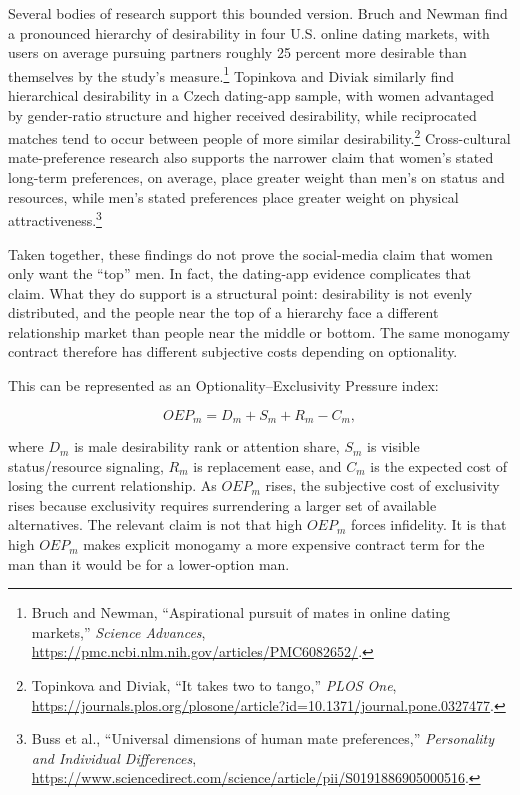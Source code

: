 \documentclass[12pt]{article}
\newcommand{\SourceNote}[1]{\footnote{#1}}
\begin{document}
Several bodies of research support this bounded version. Bruch and Newman find a pronounced hierarchy of desirability in four U.S. online dating markets, with users on average pursuing partners roughly 25 percent more desirable than themselves by the study's measure.\SourceNote{Bruch and Newman, ``Aspirational pursuit of mates in online dating markets,'' \textit{Science Advances}, \url{https://pmc.ncbi.nlm.nih.gov/articles/PMC6082652/}.} Topinkova and Diviak similarly find hierarchical desirability in a Czech dating-app sample, with women advantaged by gender-ratio structure and higher received desirability, while reciprocated matches tend to occur between people of more similar desirability.\SourceNote{Topinkova and Diviak, ``It takes two to tango,'' \textit{PLOS One}, \url{https://journals.plos.org/plosone/article?id=10.1371/journal.pone.0327477}.} Cross-cultural mate-preference research also supports the narrower claim that women's stated long-term preferences, on average, place greater weight than men's on status and resources, while men's stated preferences place greater weight on physical attractiveness.\SourceNote{Buss et al., ``Universal dimensions of human mate preferences,'' \textit{Personality and Individual Differences}, \url{https://www.sciencedirect.com/science/article/pii/S0191886905000516}.}

Taken together, these findings do not prove the social-media claim that women only want the ``top'' men. In fact, the dating-app evidence complicates that claim. What they do support is a structural point: desirability is not evenly distributed, and the people near the top of a hierarchy face a different relationship market than people near the middle or bottom. The same monogamy contract therefore has different subjective costs depending on optionality.

This can be represented as an Optionality--Exclusivity Pressure index:

\begin{equation}
  OEP_m = D_m + S_m + R_m - C_m,
\end{equation}

where $D_m$ is male desirability rank or attention share, $S_m$ is visible status/resource signaling, $R_m$ is replacement ease, and $C_m$ is the expected cost of losing the current relationship. As $OEP_m$ rises, the subjective cost of exclusivity rises because exclusivity requires surrendering a larger set of available alternatives. The relevant claim is not that high $OEP_m$ forces infidelity. It is that high $OEP_m$ makes explicit monogamy a more expensive contract term for the man than it would be for a lower-option man.
\end{document}
